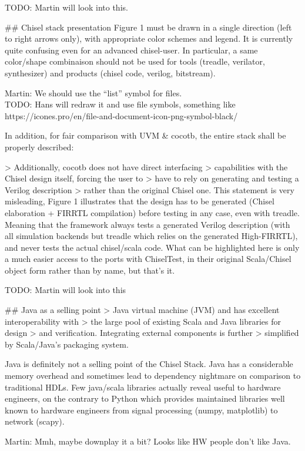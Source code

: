 \documentclass{article}
\newcommand{\todo}[1]{{\color{olive} TODO: #1}}
\newcommand{\martin}[1]{{\color{blue} Martin: #1\\}}
\begin{document}
\todo{Martin will look into this.}

\#\# Chisel stack presentation
Figure 1 must be drawn in a single direction (left to right arrows only), with appropriate color schemes and legend. It is currently quite confusing even for an advanced chisel-user.
In particular, a same color/shape combinaison should not be used for tools (treadle, verilator, synthesizer) and products (chisel code, verilog, bitstream).

\martin{We should use the ``list'' symbol for files.}
\todo{Hans will redraw it and use file symbols, something like https://icones.pro/en/file-and-document-icon-png-symbol-black/}


In addition, for fair comparison with UVM \& cocotb, the entire stack shall be properly described:

> Additionally, cocotb does not have direct interfacing
> capabilities with the Chisel design itself, forcing the user to
> have to rely on generating and testing a Verilog description
> rather than the original Chisel one.
This statement is very misleading, Figure 1 illustrates that the design has to be generated (Chisel elaboration + FIRRTL compilation) before testing in any case, even with treadle.
Meaning that the framework always tests a generated Verilog description (with all simulation backends but treadle which relies on the generated High-FIRRTL), and never tests the actual chisel/scala code.
What can be highlighted here is only a much easier access to the ports with ChiselTest, in their original Scala/Chisel object form rather than by name, but that's it.

\todo{Martin will look into this}


\#\# Java as a selling point
> Java virtual machine (JVM) and has excellent interoperability with
> the large pool of existing Scala and Java libraries for design
> and verification. Integrating external components is further
> simplified by Scala/Java's packaging system.

Java is definitely not a selling point of the Chisel Stack.
Java has a considerable memory overhead and sometimes lead to dependency nightmare on comparison to traditional HDLs.
Few java/scala libraries actually reveal useful to hardware engineers, on the contrary to Python which provides maintained libraries well known to hardware engineers from signal processing (numpy, matplotlib) to network (scapy).

\martin{Mmh, maybe downplay it a bit? Looks like HW people don't like Java.}
\end{document}
